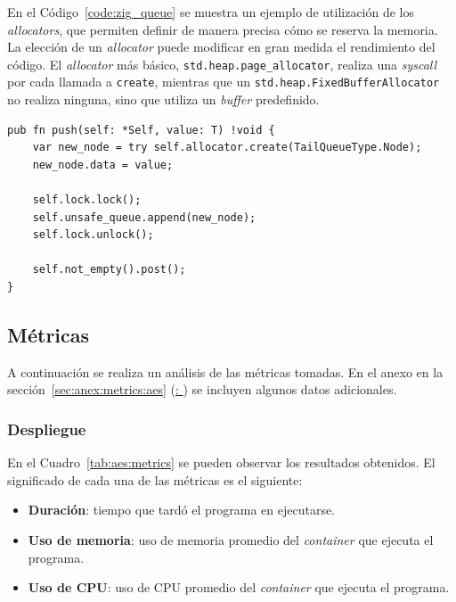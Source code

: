 \documentclass[11pt]{article}
\let\Oldsubsection\subsection
\renewcommand{\subsection}{\FloatBarrier\Oldsubsection}
\let\Oldsubsubsection\subsubsection
\renewcommand{\subsubsection}{\FloatBarrier\Oldsubsubsection}
\newcommand{\english}[1]{\textit{#1}}
\begin{document}
En el Código~\ref{code:zig_queue} se muestra un ejemplo de utilización de los \english{allocators}, que permiten definir de manera precisa cómo se reserva la memoria. La elección de un \english{allocator} puede modificar en gran medida el rendimiento del código. El \english{allocator} más básico, \lstinline{std.heap.page_allocator}, realiza una \english{syscall} por cada llamada a \lstinline{create}, mientras que un \lstinline{std.heap.FixedBufferAllocator} no realiza ninguna, sino que utiliza un \english{buffer} predefinido.

\begin{listing}[h]
\begin{verbatim}
pub fn push(self: *Self, value: T) !void {
    var new_node = try self.allocator.create(TailQueueType.Node);
    new_node.data = value;

    self.lock.lock();
    self.unsafe_queue.append(new_node);
    self.lock.unlock();

    self.not_empty().post();
}
\end{verbatim}
\caption{Implementación del método \lstinline{push} de la \english{Queue} \english{thread-safe} en Zig}
\label{code:zig_queue}
\end{listing}

\newpage

\subsection{Métricas}

A continuación se realiza un análisis de las métricas tomadas. En el anexo en la sección~\ref{sec:anex:metrics:aes} (\hyperref[sec:anex:metrics:aes]{: }) se incluyen algunos datos adicionales.

\subsubsection{Despliegue}

En el Cuadro~\ref{tab:aes:metrics} se pueden observar los resultados obtenidos. El significado de cada una de las métricas es el siguiente:

\begin{itemize}
    \item \textbf{Duración}: tiempo que tardó el programa en ejecutarse.
    \item \textbf{Uso de memoria}: uso de memoria promedio del \english{container} que ejecuta el programa.
    \item \textbf{Uso de CPU}: uso de CPU promedio del \english{container} que ejecuta el programa.
\end{itemize}
\end{document}
